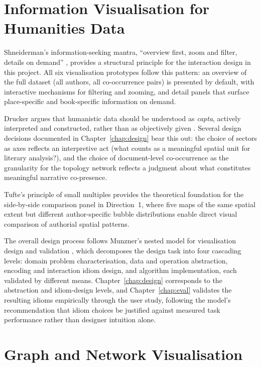 \documentclass[logo,msc]{infthesis}
\begin{document}
\section{Information Visualisation for Humanities Data}
 
Shneiderman's information-seeking mantra, ``overview first, zoom and filter, details on demand'' \cite{shneiderman1996}, provides a structural principle for the interaction design in this project. All six visualisation prototypes follow this pattern: an overview of the full dataset (all authors, all co-occurrence pairs) is presented by default, with interactive mechanisms for filtering and zooming, and detail panels that surface place-specific and book-specific information on demand.
 
Drucker argues that humanistic data should be understood as \emph{capta}, actively interpreted and constructed, rather than as objectively given \cite{drucker2011}. Several design decisions documented in Chapter~\ref{chap:design} bear this out: the choice of sectors as axes reflects an interpretive act (what counts as a meaningful spatial unit for literary analysis?), and the choice of document-level co-occurrence as the granularity for the topology network reflects a judgment about what constitutes meaningful narrative co-presence.
 
Tufte's principle of small multiples \cite{tufte1983} provides the theoretical foundation for the side-by-side comparison panel in Direction~1, where five maps of the same spatial extent but different author-specific bubble distributions enable direct visual comparison of authorial spatial patterns.

The overall design process follows Munzner's nested model for visualisation design and validation \cite{munzner2014}, which decomposes the design task into four cascading levels: domain problem characterisation, data and operation abstraction, encoding and interaction idiom design, and algorithm implementation, each validated by different means. Chapter~\ref{chap:design} corresponds to the abstraction and idiom-design levels, and Chapter~\ref{chap:eval} validates the resulting idioms empirically through the user study, following the model's recommendation that idiom choices be justified against measured task performance rather than designer intuition alone.
 
\section{Graph and Network Visualisation}
 
\end{document}

